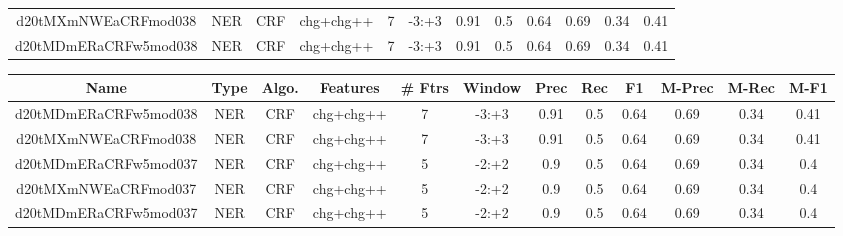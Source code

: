 \documentclass[a4paper]{article}
\begin{document}
\begin{landscape}
\begin{center}
\begin{tabular}{ |c|c|c|c|c|c|c|c|c|c|c|c|}
 	
 
 	
 		
 		\small{ d20tMXmNWEaCRFmod038 } & NER & CRF & chg+chg++  &  7 &  -3:+3  &  0.91 & 0.5 & 0.64  &  0.69 & 0.34 & 0.41 \\
 		

 	
 
 	
 		
 		\small{ d20tMDmERaCRFw5mod038 } & NER & CRF & chg+chg++  &  7 &  -3:+3  &  0.91 & 0.5 & 0.64  &  0.69 & 0.34 & 0.41 \\
 		
 \hline
\end{tabular}
\end{center}




\begin{center}
\begin{tabular}{ |c|c|c|c|c|c|c|c|c|c|c|c|} 
 \hline
 	Name & Type & Algo. & Features & \# Ftrs & Window & Prec & Rec & F1 & M-Prec & M-Rec & M-F1\\
 \hline

 		

 	
 
 	
 		
 		\small{ d20tMDmERaCRFw5mod038 } & NER & CRF & chg+chg++  &  7 &  -3:+3  &  0.91 & 0.5 & 0.64  &  0.69 & 0.34 & 0.41 \\
 		

 	
 
 	
 		
 		\small{ d20tMXmNWEaCRFmod038 } & NER & CRF & chg+chg++  &  7 &  -3:+3  &  0.91 & 0.5 & 0.64  &  0.69 & 0.34 & 0.41 \\
 		

 	
 
 	
 		
 		\small{ d20tMDmERaCRFw5mod037 } & NER & CRF & chg+chg++  &  5 &  -2:+2  &  0.9 & 0.5 & 0.64  &  0.69 & 0.34 & 0.4 \\
 		

 	
 
 	
 		
 		\small{ d20tMXmNWEaCRFmod037 } & NER & CRF & chg+chg++  &  5 &  -2:+2  &  0.9 & 0.5 & 0.64  &  0.69 & 0.34 & 0.4 \\
 		

 	
 
 	
 		
 		\small{ d20tMDmERaCRFw5mod037 } & NER & CRF & chg+chg++  &  5 &  -2:+2  &  0.9 & 0.5 & 0.64  &  0.69 & 0.34 & 0.4 \\
 		


\end{tabular}
\end{center}
\end{landscape}
\end{document}
